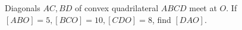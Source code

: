 Diagonals $AC,BD$ of convex quadrilateral $ABCD$ meet at $O$. If $[ABO]=5,[BCO]=10,[CDO]=8$, find $[DAO]$.
